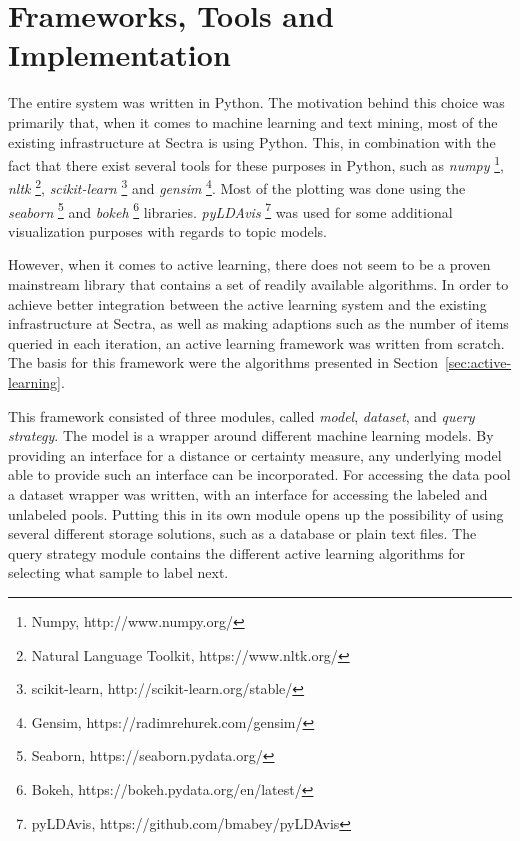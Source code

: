 \section{Frameworks, Tools and Implementation}

The entire system was written in Python.
The motivation behind this choice was primarily that, when it comes to machine learning and text mining, most of the existing infrastructure at Sectra is using Python.
This, in combination with the fact that there exist several tools for these purposes in Python, such as \textit{numpy} \footnote{Numpy, http://www.numpy.org/}, \textit{nltk} \footnote{Natural Language Toolkit, https://www.nltk.org/}, \textit{scikit-learn} \footnote{scikit-learn, http://scikit-learn.org/stable/} and \textit{gensim} \footnote{Gensim, https://radimrehurek.com/gensim/}.
Most of the plotting was done using the \textit{seaborn} \footnote{Seaborn, https://seaborn.pydata.org/} and \textit{bokeh} \footnote{Bokeh, https://bokeh.pydata.org/en/latest/} libraries.
\textit{pyLDAvis} \footnote{pyLDAvis, https://github.com/bmabey/pyLDAvis} was used for some additional visualization purposes with regards to topic models.

However, when it comes to active learning, there does not seem to be a proven mainstream library that contains a set of readily available algorithms.
In order to achieve better integration between the active learning system and the existing infrastructure at Sectra, as well as making adaptions such as the number of items queried in each iteration, an active learning framework was written from scratch.
The basis for this framework were the algorithms presented in Section~\ref{sec:active-learning}.

This framework consisted of three modules, called \textit{model}, \textit{dataset}, and \textit{query strategy}.
The model is a wrapper around different machine learning models.
By providing an interface for a distance or certainty measure, any underlying model able to provide such an interface can be incorporated.
For accessing the data pool a dataset wrapper was written, with an interface for accessing the labeled and unlabeled pools.
Putting this in its own module opens up the possibility of using several different storage solutions, such as a database or plain text files.
The query strategy module contains the different active learning algorithms for selecting what sample to label next.
